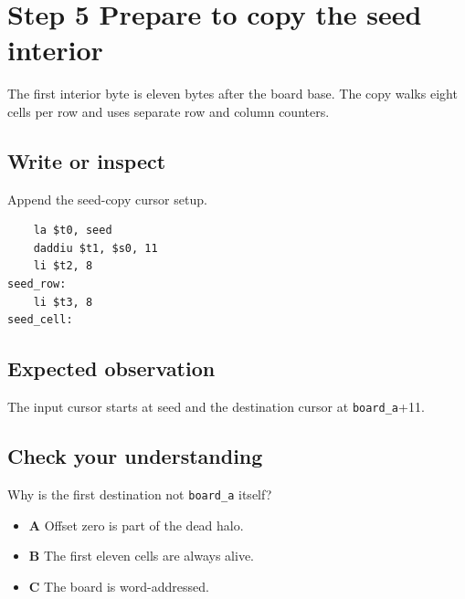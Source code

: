 \section{Step 5 Prepare to copy the seed
  interior}\label{008-life-generations-s05-step-5-prepare-to-copy-the-seed-interior}

The first interior byte is eleven bytes after the board base. The copy
walks eight cells per row and uses separate row and column counters.

\subsection{Write or
  inspect}\label{008-life-generations-s05-write-or-inspect}

Append the seed-copy cursor setup.

\begin{verbatim}
    la $t0, seed
    daddiu $t1, $s0, 11
    li $t2, 8
seed_row:
    li $t3, 8
seed_cell:
\end{verbatim}

\subsection{Expected
  observation}\label{008-life-generations-s05-expected-observation}

The input cursor starts at seed and the destination cursor at
\texttt{board\_a}+11.

\subsection{Check your
  understanding}\label{008-life-generations-s05-check-your-understanding}

Why is the first destination not \texttt{board\_a} itself?

\begin{itemize}
  \tightlist
  \item
        \textbf{A} Offset zero is part of the dead halo.
  \item
        \textbf{B} The first eleven cells are always alive.
  \item
        \textbf{C} The board is word-addressed.
\end{itemize}
